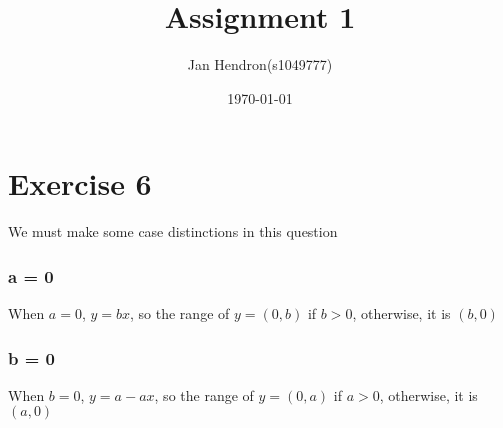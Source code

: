 \documentclass[11pt]{article}
\author{Jan Hendron(s1049777)}
\date{\today}
\title{Assignment 1}
\begin{document}
\maketitle

\section*{Exercise 6}
\label{sec:org279db86}
We must make some case distinctions in this question

\subsubsection*{a = 0}
When $a = 0$, $y = bx$, so the range of $y = (0,b)$ if $b > 0$, otherwise, it is $(b,0)$
\subsubsection*{b = 0}
When $b = 0$, $y = a - ax$, so the range of $y = (0,a)$ if $a > 0$, otherwise, it is $(a,0)$
\end{document}
